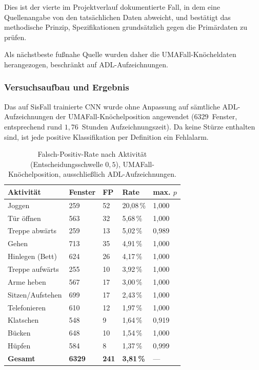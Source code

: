 \documentclass[11pt,a4paper,oneside]{report}
\begin{document}
Dies ist der vierte im Projektverlauf dokumentierte Fall, in dem eine
Quellenangabe von den tatsächlichen Daten abweicht, und bestätigt das
methodische Prinzip, Spezifikationen grundsätzlich gegen die
Primärdaten zu prüfen.

Als nächstbeste fußnahe Quelle wurden daher die
UMAFall-Knöcheldaten herangezogen, beschränkt auf ADL-Aufzeichnungen.

\subsubsection{Versuchsaufbau und Ergebnis}

Das auf SisFall trainierte CNN wurde ohne Anpassung auf sämtliche
ADL-Aufzeichnungen der UMAFall-Knöchelposition angewendet
($6329$~Fenster, entsprechend rund $1{,}76$~Stunden
Aufzeichnungszeit). Da keine Stürze enthalten sind, ist jede positive
Klassifikation per Definition ein Fehlalarm.

\begin{table}[H]
\centering
\caption{Falsch-Positiv-Rate nach Aktivität (Entscheidungsschwelle
         $0{,}5$), UMAFall-Knöchelposition, ausschließlich
         ADL-Aufzeichnungen.}
\label{tab:fptest}
\small
\begin{tabularx}{0.9\textwidth}{l C{1.8cm} C{1.3cm} C{1.6cm} C{1.5cm}}
\toprule
\textbf{Aktivität} & \textbf{Fenster} & \textbf{FP} & \textbf{Rate} & \textbf{max. $p$} \\
\midrule
Joggen                  & 259 & 52 & 20,08\,\% & 1,000 \\
Tür öffnen              & 563 & 32 &  5,68\,\% & 1,000 \\
Treppe abwärts          & 259 & 13 &  5,02\,\% & 0,989 \\
Gehen                   & 713 & 35 &  4,91\,\% & 1,000 \\
Hinlegen (Bett)         & 624 & 26 &  4,17\,\% & 1,000 \\
Treppe aufwärts         & 255 & 10 &  3,92\,\% & 1,000 \\
Arme heben              & 567 & 17 &  3,00\,\% & 1,000 \\
Sitzen/Aufstehen        & 699 & 17 &  2,43\,\% & 1,000 \\
Telefonieren            & 610 & 12 &  1,97\,\% & 1,000 \\
Klatschen               & 548 &  9 &  1,64\,\% & 0,919 \\
Bücken                  & 648 & 10 &  1,54\,\% & 1,000 \\
Hüpfen                  & 584 &  8 &  1,37\,\% & 0,999 \\
\midrule
\textbf{Gesamt}         & \textbf{6329} & \textbf{241} & \textbf{3,81\,\%} & --- \\
\bottomrule
\end{tabularx}
\end{table}
\end{document}
